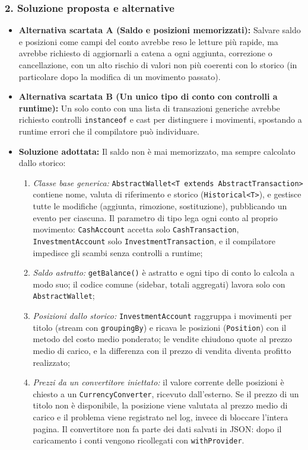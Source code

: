 \documentclass[11pt,a4paper,openright]{report}
\begin{document}
\subsubsection*{2. Soluzione proposta e alternative}
\begin{itemize}
    \item \textbf{Alternativa scartata A (Saldo e posizioni memorizzati):} Salvare saldo e posizioni come campi del conto avrebbe reso le letture più rapide, ma avrebbe richiesto di aggiornarli a catena a ogni aggiunta, correzione o cancellazione, con un alto rischio di valori non più coerenti con lo storico (in particolare dopo la modifica di un movimento passato).
    \item \textbf{Alternativa scartata B (Un unico tipo di conto con controlli a runtime):} Un solo conto con una lista di transazioni generiche avrebbe richiesto controlli \texttt{instanceof} e cast per distinguere i movimenti, spostando a runtime errori che il compilatore può individuare.
    \item \textbf{Soluzione adottata:} Il saldo non è mai memorizzato, ma sempre calcolato dallo storico:
    \begin{enumerate}
        \item \emph{Classe base generica:} \texttt{AbstractWallet<T extends AbstractTransaction>} contiene nome, valuta di riferimento e storico (\texttt{Historical<T>}), e gestisce tutte le modifiche (aggiunta, rimozione, sostituzione), pubblicando un evento per ciascuna. Il parametro di tipo lega ogni conto al proprio movimento: \texttt{CashAccount} accetta solo \texttt{CashTransaction}, \texttt{InvestmentAccount} solo \texttt{InvestmentTransaction}, e il compilatore impedisce gli scambi senza controlli a runtime;
        \item \emph{Saldo astratto:} \texttt{getBalance()} è astratto e ogni tipo di conto lo calcola a modo suo; il codice comune (sidebar, totali aggregati) lavora solo con \texttt{AbstractWallet};
        \item \emph{Posizioni dallo storico:} \texttt{InvestmentAccount} raggruppa i movimenti per titolo (stream con \texttt{groupingBy}) e ricava le posizioni (\texttt{Position}) con il metodo del costo medio ponderato; le vendite chiudono quote al prezzo medio di carico, e la differenza con il prezzo di vendita diventa profitto realizzato;
        \item \emph{Prezzi da un convertitore iniettato:} il valore corrente delle posizioni è chiesto a un \texttt{CurrencyConverter}, ricevuto dall'esterno. Se il prezzo di un titolo non è disponibile, la posizione viene valutata al prezzo medio di carico e il problema viene registrato nel log, invece di bloccare l'intera pagina. Il convertitore non fa parte dei dati salvati in JSON: dopo il caricamento i conti vengono ricollegati con \texttt{withProvider}.
    \end{enumerate}
\end{itemize}
\end{document}

